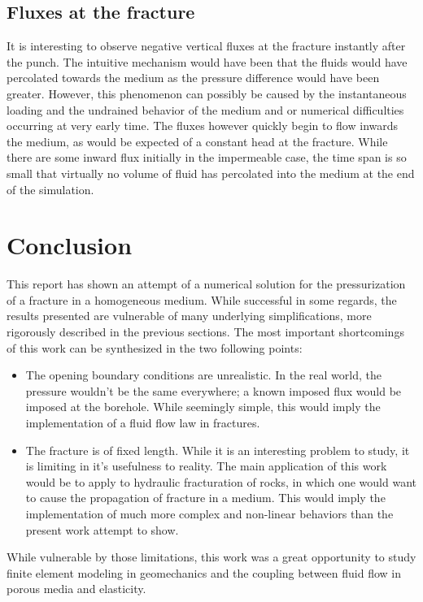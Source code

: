 \documentclass{article}
\begin{document}
\subsection{Fluxes at the fracture}
It is interesting to observe negative vertical fluxes at the fracture instantly after the punch. The intuitive mechanism would have been that the fluids would have percolated towards the medium as the pressure difference would have been greater. However, this phenomenon can possibly be caused by the instantaneous loading and the undrained behavior of the medium and or numerical difficulties occurring at very early time. The fluxes however quickly begin to flow inwards the medium, as would be expected of a constant head at the fracture. While there are some inward flux initially in the impermeable case, the time span is so small that virtually no volume of fluid has percolated into the medium at the end of the simulation.

\section{Conclusion}

This report has shown an attempt of a numerical solution for the pressurization of a fracture in a homogeneous medium. While successful in some regards, the results presented are vulnerable of many underlying simplifications, more rigorously described in the previous sections. The most important shortcomings of this work can be synthesized in the two following points:
\begin{itemize}
	\item The opening boundary conditions are unrealistic. In the real world, the pressure wouldn't be the same everywhere; a known imposed flux would be imposed at the borehole. While seemingly simple, this would imply the implementation of a fluid flow law in fractures.
	\item The fracture is of fixed length. While it is an interesting problem to study, it is limiting in it's usefulness to reality. The main application of this work would be to apply to hydraulic fracturation of rocks, in which one would want to cause the propagation of fracture in a medium. This would imply the implementation of much more complex and non-linear behaviors than the present work attempt to show.
\end{itemize}

While vulnerable by those limitations, this work was a great opportunity to study finite element modeling in geomechanics and the coupling between fluid flow in porous media and elasticity.



\end{document}
